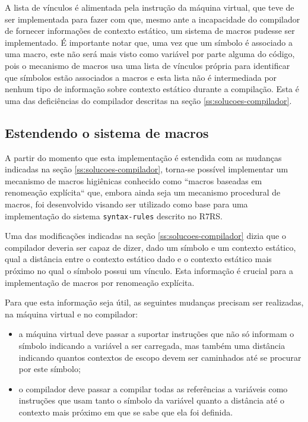 A lista de vínculos é alimentada pela instrução  da máquina
virtual, que teve de ser implementada para fazer com que, mesmo ante a
incapacidade do compilador de fornecer informações de contexto estático, um
sistema de macros pudesse ser implementado. É importante notar que, uma vez que
um símbolo é associado a uma macro, este não será mais visto como variável por
parte alguma do código, pois o mecanismo de macros usa uma lista de vínculos
própria para identificar que símbolos estão associados a macros e esta lista
não é intermediada por nenhum tipo de informação sobre contexto estático
durante a compilação. Esta é uma das deficiências do compilador descritas na
seção \ref{ss:solucoes-compilador}.

\subsection{Estendendo o sistema de macros}
\label{ss:solucoes-macros}

A partir do momento que esta implementação é estendida com as mudanças indicadas
na seção \ref{ss:solucoes-compilador}, torna-se possível implementar um 
mecanismo de macros higiênicas conhecido como ``macros baseadas em renomeação
explícita`` que, embora ainda seja um mecanismo procedural de macros, foi
desenvolvido visando ser utilizado como base para uma implementação do sistema
\texttt{syntax-rules} descrito no \acs{R7RS}\cite{scheme-of-things}.

Uma das modificações indicadas na seção \ref{ss:solucoes-compilador} dizia que
o compilador deveria ser capaz de dizer, dado um símbolo e um contexto estático,
qual a distância entre o contexto estático dado e o contexto estático mais
próximo no qual o símbolo possui um vínculo. Esta informação é crucial para
a implementação de macros por renomeação explícita.

Para que esta informação seja útil, as seguintes mudanças precisam ser 
realizadas, na máquina virtual e no compilador: 

\begin{itemize}

\item a máquina virtual deve passar a suportar instruções  que não
só informam o símbolo indicando a variável a ser carregada, mas também uma
distância indicando quantos contextos de escopo devem ser caminhados até se
procurar por este símbolo;

\item o compilador deve passar a compilar todas as referências a variáveis
como instruções  que usam tanto o símbolo da variável quanto a
distância até o contexto mais próximo em que se sabe que ela foi definida.

\end{itemize}

